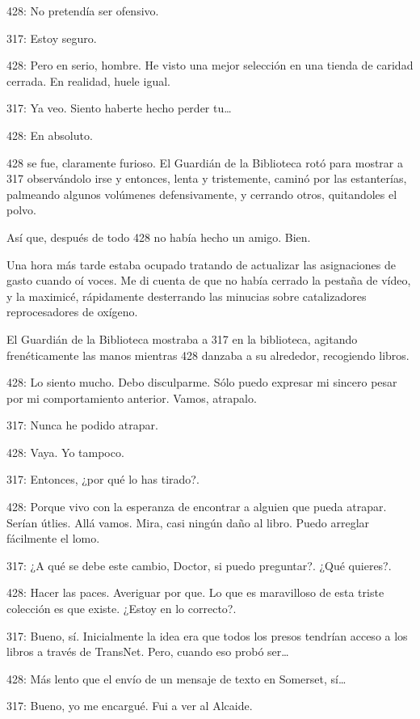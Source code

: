 428: No pretendía ser ofensivo.

317: Estoy seguro.

428: Pero en serio, hombre. He visto una mejor selección en una tienda
de caridad cerrada. En realidad, huele igual.

317: Ya veo. Siento haberte hecho perder tu\ldots{}

428: En absoluto.

428 se fue, claramente furioso. El Guardián de la Biblioteca rotó para
mostrar a 317 observándolo irse y entonces, lenta y tristemente, caminó
por las estanterías, palmeando algunos volúmenes defensivamente, y
cerrando otros, quitandoles el polvo.

Así que, después de todo 428 no había hecho un amigo. Bien.

Una hora más tarde estaba ocupado tratando de actualizar las
asignaciones de gasto cuando oí voces. Me di cuenta de que no había
cerrado la pestaña de vídeo, y la maximicé, rápidamente desterrando las
minucias sobre catalizadores reprocesadores de oxígeno.

El Guardián de la Biblioteca mostraba a 317 en la biblioteca, agitando
frenéticamente las manos mientras 428 danzaba a su alrededor, recogiendo
libros.

428: Lo siento mucho. Debo disculparme. Sólo puedo expresar mi sincero
pesar por mi comportamiento anterior. Vamos, atrapalo.

317: Nunca he podido atrapar.

428: Vaya. Yo tampoco.

317: Entonces, ¿por qué lo has tirado?.

428: Porque vivo con la esperanza de encontrar a alguien que pueda
atrapar. Serían útlies. Allá vamos. Mira, casi ningún daño al libro.
Puedo arreglar fácilmente el lomo.

317: ¿A qué se debe este cambio, Doctor, si puedo preguntar?. ¿Qué
quieres?.

428: Hacer las paces. Averiguar por que. Lo que es maravilloso de esta
triste colección es que existe. ¿Estoy en lo correcto?.

317: Bueno, sí. Inicialmente la idea era que todos los presos tendrían
acceso a los libros a través de TransNet. Pero, cuando eso probó
ser\ldots{}

428: Más lento que el envío de un mensaje de texto en Somerset,
sí\ldots{}

317: Bueno, yo me encargué. Fui a ver al Alcaide.

